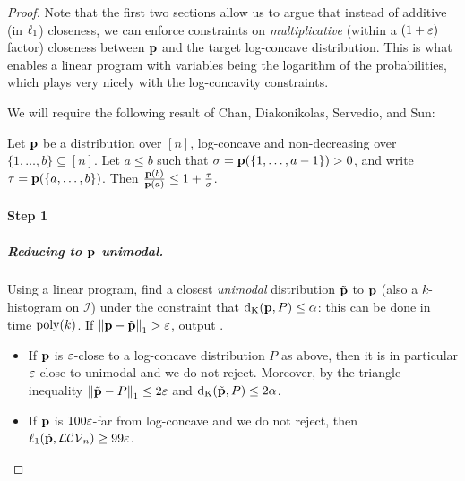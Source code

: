 \begin{proof}
Note that the first two sections allow us to argue that instead of additive (in $\lp[1]$) closeness, we can enforce constraints on \emph{multiplicative} (within a $(1+\eps)$ factor) closeness between $\D$ and the target log-concave distribution. This is what enables a linear program with variables being the logarithm of the probabilities, which plays very nicely with the log-concavity constraints. \medskip

\noindent We will require the following result of Chan, Diakonikolas, Servedio, and Sun:
\begin{theorem}\label{lemma:cdss13:41}
Let $\D$ be a distribution over $[n]$, log-concave and non-decreasing over $\{1,\dots,b\} \subseteq [n]$. Let $a\leq b$ such that
 $\sigma = \D(\{1,\dots,a-1\}) > 0$, and write $\tau=\D(\{a,\dots,b\})$. Then 
 		$\frac{\D(b)}{\D(a)} \leq 1+\frac{\tau}{\sigma}$.
\end{theorem}

\paragraph{Step 1}\label{stage:1}

\subparagraph{Reducing to $\D$ unimodal.}
Using a linear program, find a closest \emph{unimodal} distribution $\tilde{\D}$ to $\D$ (also a $k$-histogram on $\mathcal{I}$) under the constraint that $\kolmogorov{\D}{P} \leq \alpha$: this can be done in time $\poly(k)$. If $\normone{\D-\tilde{\D}} > \eps$, output \reject.

\begin{itemize}
  \item If $\D$ is $\eps$-close to a log-concave distribution $P$ as above, then it is in particular $\eps$-close to unimodal and we do not reject. Moreover, by the triangle inequality $\normone{\tilde{\D} - P} \leq 2\eps$ and $\kolmogorov{\tilde{\D}}{P} \leq 2\alpha$.
  \item If $\D$ is $100\eps$-far from log-concave and we do not reject, then $\lp[1](\tilde{\D},\classlogconcave) \geq 99\eps$.
\end{itemize}


\end{proof}

